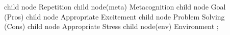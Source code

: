 child{
        node{
                Repetition
            }
        child{
                node(meta){
                        Metacognition
                    }
                child{
                        node{
                                Goal\\(Pros)
                            }
                        child{
                                node{
                                        Appropriate Excitement
                                    }
                            }
                    }
                child{
                        node{
                                Problem Solving\\(Cons)
                            }
                        child{
                                node{
                                        Appropriate Stress
                                    }
                            }
                    }
            }
        child{
                node(env){
                        Environment
                    }
            }
    }
;